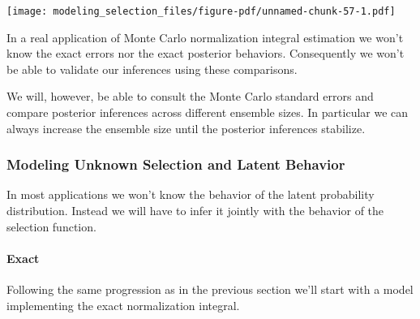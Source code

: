 \documentclass[
  letterpaper,
  DIV=11,
  numbers=noendperiod]{scrartcl}
\let\oldparagraph\paragraph
\renewcommand{\paragraph}[1]{\oldparagraph{#1}\mbox{}}
\begin{document}
\texttt{[image: modeling\_selection\_files/figure-pdf/unnamed-chunk-57-1.pdf]}

In a real application of Monte Carlo normalization integral estimation
we won't know the exact errors nor the exact posterior behaviors.
Consequently we won't be able to validate our inferences using these
comparisons.

We will, however, be able to consult the Monte Carlo standard errors and
compare posterior inferences across different ensemble sizes. In
particular we can always increase the ensemble size until the posterior
inferences stabilize.

\subsubsection{Modeling Unknown Selection and Latent
Behavior}\label{modeling-unknown-selection-and-latent-behavior}

In most applications we won't know the behavior of the latent
probability distribution. Instead we will have to infer it jointly with
the behavior of the selection function.

\paragraph{Exact}\label{exact-1}

Following the same progression as in the previous section we'll start
with a model implementing the exact normalization integral.
\end{document}
